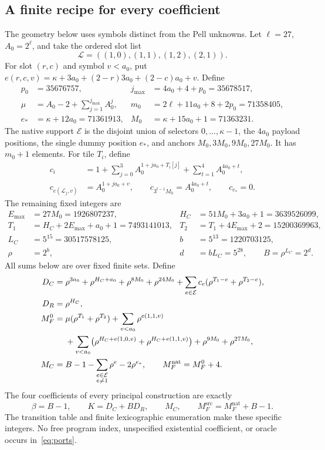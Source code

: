 \documentclass[11pt,a4paper]{article}
\theoremstyle{remark}\newtheorem{remark}[theorem]{Remark}
\newcommand{\Msrc}{M_F^{\mathrm{src}}}
\newcommand{\Mnat}{M_F^{\mathrm{nat}}}
\begin{document}
\subsection{A finite recipe for every coefficient}
The geometry below uses symbols distinct from the Pell unknowns. Let
\(\ell=27\), \(A_0=2^\ell\), and take the ordered slot list
\[
 \mathcal L=((1,0),(1,1),(1,2),(2,1)).
\]
For slot \((r,c)\) and symbol \(v<a_0\), put
\(e(r,c,v)=\kappa+3a_0+(2-r)3a_0+(2-c)a_0+v\).
Define
\begin{align*}
 p_0&=35676757,&j_{\max}&=4a_0+4+p_0=35678517,\\
 \mu&=A_0-2+\sum_{j=1}^{j_{\max}}A_0^j,&
 m_0&=2\ell+11a_0+8+2p_0=71358405,\\
 e_*&=\kappa+12a_0=71361913,& M_0&=\kappa+15a_0+1=71363231.
\end{align*}
The native support \(\mathcal E\) is the disjoint union of selectors
\(0,\ldots,\kappa-1\), the \(4a_0\) payload positions, the single
dummy position \(e_*\), and anchors \(M_0,3M_0,9M_0,27M_0\).
It has \(m_0+1\) elements. For tile \(T_i\), define
\begin{align*}
 c_i&=1+\sum_{j=0}^3 A_0^{1+ja_0+T_i[j]}
              +\sum_{t=1}^4A_0^{4a_0+t},\\
 c_{e(\mathcal L_j,v)}&=A_0^{1+ja_0+v},\qquad
 c_{3^{t-1}M_0}=A_0^{4a_0+t},\qquad c_{e_*}=0.
\end{align*}
The remaining fixed integers are
\begin{align*}
 E_{\max}&=27M_0=1926807237,&
 H_C&=51M_0+3a_0+1=3639526099,\\
 T_1&=H_C+2E_{\max}+a_0+1=7493141013,&
 T_2&=T_1+4E_{\max}+2=15200369963,\\
 L_C&=5^{15}=30517578125,& b&=5^{13}=1220703125,\\
 \rho&=2^b,&d&=bL_C=5^{28},\qquad B=\rho^{L_C}=2^d.
\end{align*}
All sums below are over fixed finite sets. Define
\begin{align}
 D_C={}&\rho^{3a_0}+\rho^{H_C+a_0}+\rho^{8M_0}+\rho^{24M_0}
       +\sum_{e\in\mathcal E}c_e(\rho^{T_1-e}+\rho^{T_2-e}),\notag\\
 D_R={}&\rho^{H_C},\notag\\
 M_F^0={}&\mu(\rho^{T_1}+\rho^{T_2})
       +\sum_{v<a_0}\rho^{e(1,1,v)}\notag\\
 &+\sum_{v<a_0}\bigl(\rho^{H_C+e(1,0,v)}+
                         \rho^{H_C+e(1,1,v)}\bigr)
       +\rho^{9M_0}+\rho^{27M_0},\notag\\
 M_C={}&B-1-\sum_{\substack{e\in\mathcal E\\e\ne1}}\rho^e
                 -2\rho^{e_*},\qquad \Mnat=M_F^0+4.
\end{align}
The four coefficients of every principal construction are exactly
\begin{equation}
 \boxed{\beta=B-1,\qquad K=D_C+BD_R,\qquad M_C,
                  \qquad\Msrc=\Mnat+B-1.}\label{eq:ports}
\end{equation}
The transition table and finite lexicographic enumeration make these
specific integers. No free program index, unspecified existential
coefficient, or oracle occurs in~\eqref{eq:ports}.
\end{document}
